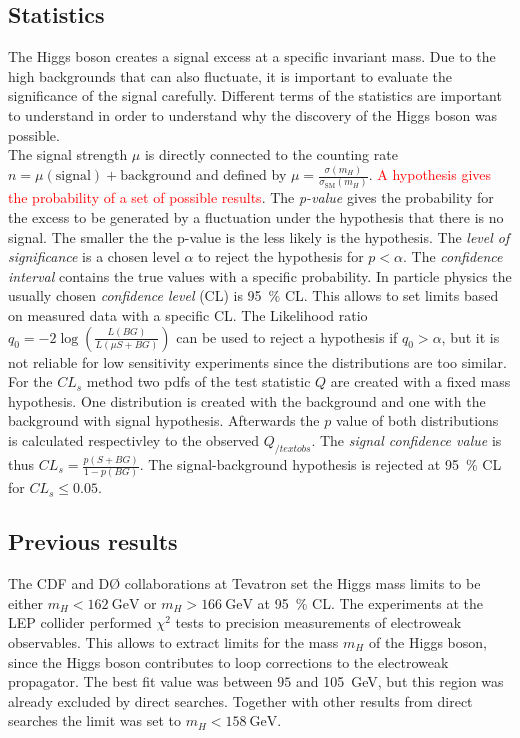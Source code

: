 \subsection{Statistics}
The Higgs boson creates a signal excess at a specific invariant mass. Due to the high backgrounds that can also fluctuate, it is important to evaluate the significance of the signal carefully. Different terms of the statistics are important to understand in order to understand why the discovery of the Higgs boson was possible.\\
The signal strength $\mu$ is directly connected to the counting rate $n=\mu(\text{signal})+\text{background}$ and defined by $\mu = \frac{\sigma(m_H)}{\sigma_{\text{SM}}(m_H)}$. \textcolor{red}{A hypothesis gives the probability of a set of possible results}. The \textit{p-value} gives the probability for the excess to be generated by a fluctuation under the hypothesis that there is no signal. The smaller the the p-value is the less likely is the hypothesis. The \textit{level of significance} is a chosen level $\alpha$ to reject the hypothesis for $p<\alpha$. The \textit{confidence interval} contains the true values with a specific probability. In particle physics the usually chosen \textit{confidence level} (CL) is \SI{95}{\percent} CL. This allows to set limits based on measured data with a specific CL.
The Likelihood ratio $q_0 = -2 \log \left(\frac{L(BG)}{L(\mu S+BG)}\right)$ can be used to reject a hypothesis if $q_0>\alpha$, but it is not reliable for low sensitivity experiments since the distributions are too similar.\\
For the $CL_s$ method two pdfs of the test statistic $Q$ are created with a fixed mass hypothesis. One distribution is created with the background and one with the background with signal hypothesis. Afterwards the $p$ value of both distributions is calculated respectivley to the observed $Q_{/text{obs}}$. The \textit{signal confidence value} is thus $CL_s = \frac{p(S+BG)}{1-p(BG)}$. The signal-background hypothesis is rejected at \SI{95}{\percent} CL for $CL_s\leq 0.05$.
\subsection{Previous results}
The CDF and D\O\; collaborations at Tevatron set the Higgs mass limits to be either $m_H<\SI{162}{\GeV}$ or $m_H>\SI{166}{\GeV}$ at \SI{95}{\percent} CL. The experiments at the LEP collider performed $\chi^2$ tests to precision measurements of electroweak observables. This allows to extract limits for the mass $m_H$ of the Higgs boson, since the Higgs boson contributes to loop corrections to the electroweak propagator. The best fit value was between $95$ and \SI{105}{\GeV}, but this region was already excluded by direct searches. Together with other results from direct searches the limit was set to $m_H < \SI{158}{\GeV}$.

